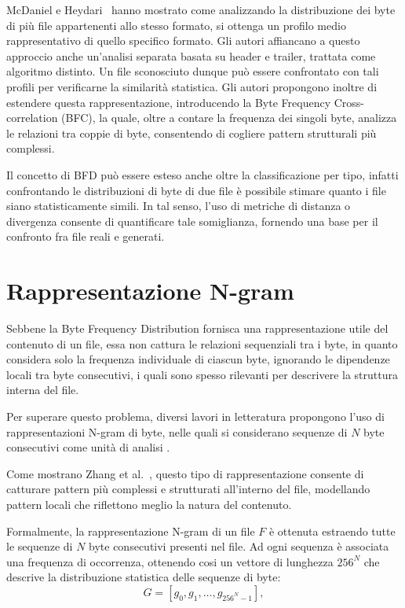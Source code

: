 \documentclass{report}
\begin{document}
McDaniel e Heydari~\cite{mcdaniel2003content} hanno mostrato come analizzando la distribuzione dei byte di più file appartenenti allo stesso formato,
si ottenga un profilo medio rappresentativo di quello specifico formato.
Gli autori affiancano a questo approccio anche un’analisi separata basata su header e trailer, trattata come algoritmo distinto.
Un file sconosciuto dunque può essere confrontato con tali profili per verificarne la similarità statistica.
Gli autori propongono inoltre di estendere questa rappresentazione, introducendo la Byte Frequency Cross-correlation (BFC),
la quale, oltre a contare la frequenza dei singoli byte, analizza le relazioni tra coppie di byte, consentendo di
cogliere pattern strutturali più complessi.


Il concetto di BFD può essere esteso anche oltre la classificazione per tipo, infatti
confrontando le distribuzioni di byte di due file è possibile stimare quanto i file siano statisticamente simili.
In tal senso, l’uso di metriche di distanza o divergenza consente di quantificare tale somiglianza, fornendo una base per il confronto fra file reali e generati.



\section{Rappresentazione N-gram}

Sebbene la Byte Frequency Distribution fornisca una rappresentazione utile del contenuto di un file, essa non cattura le relazioni sequenziali tra i byte,
in quanto considera solo la frequenza individuale di ciascun byte, ignorando le dipendenze locali tra byte consecutivi, 
i quali sono spesso rilevanti per descrivere la struttura interna del file.

Per superare questo problema, diversi lavori in letteratura propongono l’uso di rappresentazioni N-gram di byte,
nelle quali si considerano sequenze di $N$ byte consecutivi come unità di analisi \cite{li2019mdba,kolter2006executables}.

Come mostrano Zhang et al.~\cite{li2019mdba}, questo tipo di rappresentazione consente di catturare pattern più complessi e strutturati all’interno del file,
modellando pattern locali che riflettono meglio la natura del contenuto.

\bigskip

Formalmente, la rappresentazione N-gram di un file $F$ è ottenuta estraendo tutte le sequenze di $N$ byte consecutivi presenti nel file.
Ad ogni sequenza è associata una frequenza di occorrenza, ottenendo cosi un vettore
di lunghezza $256^N$ che descrive la distribuzione statistica delle sequenze di byte:
\[
G = [g_0, g_1, \dots, g_{256^N - 1}],
\]
\end{document}
